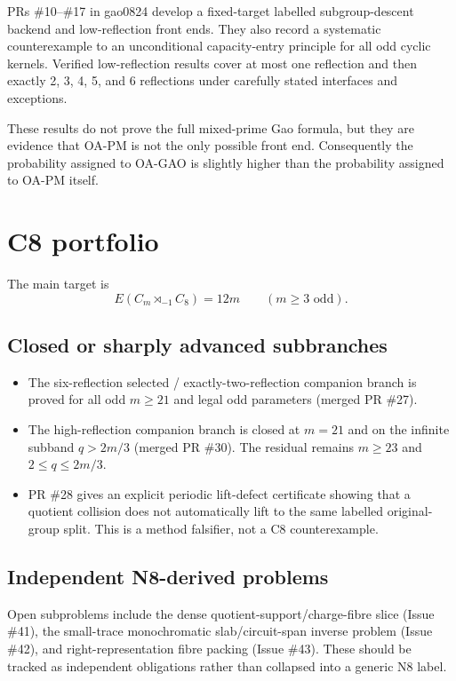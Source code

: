 \documentclass[11pt,a4paper]{ctexart}
\begin{document}
PRs \#10--\#17 in gao0824 develop a fixed-target labelled subgroup-descent backend and low-reflection front ends. They also record a systematic counterexample to an unconditional capacity-entry principle for all odd cyclic kernels. Verified low-reflection results cover at most one reflection and then exactly 2, 3, 4, 5, and 6 reflections under carefully stated interfaces and exceptions.

These results do not prove the full mixed-prime Gao formula, but they are evidence that OA-PM is not the only possible front end. Consequently the probability assigned to OA-GAO is slightly higher than the probability assigned to OA-PM itself.

\section{C8 portfolio}

The main target is
\[
E(C_m\rtimes_{-1}C_8)=12m
\qquad(m\ge3\text{ odd}).
\]

\subsection{Closed or sharply advanced subbranches}

\begin{itemize}
\item The six-reflection selected / exactly-two-reflection companion branch is proved for all odd $m\ge21$ and legal odd parameters (merged PR \#27).
\item The high-reflection companion branch is closed at $m=21$ and on the infinite subband $q>2m/3$ (merged PR \#30). The residual remains $m\ge23$ and $2\le q\le2m/3$.
\item PR \#28 gives an explicit periodic lift-defect certificate showing that a quotient collision does not automatically lift to the same labelled original-group split. This is a method falsifier, not a C8 counterexample.
\end{itemize}

\subsection{Independent N8-derived problems}

Open subproblems include the dense quotient-support/charge-fibre slice (Issue \#41), the small-trace monochromatic slab/circuit-span inverse problem (Issue \#42), and right-representation fibre packing (Issue \#43). These should be tracked as independent obligations rather than collapsed into a generic N8 label.
\end{document}
